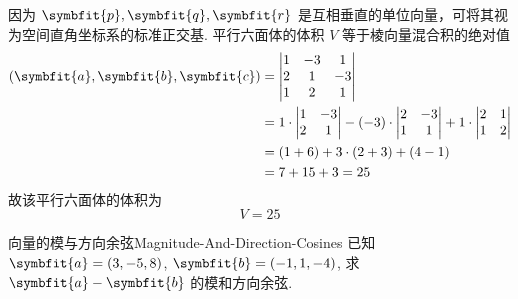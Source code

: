 \begin{solution}
    因为 $\symbfit{p}, \symbfit{q}, \symbfit{r}$ 是互相垂直的单位向量，可将其视为空间直角坐标系的标准正交基. 平行六面体的体积 $V$ 等于棱向量混合积的绝对值
    \begin{equation}
        \begin{aligned}
            (\symbfit{a}, \symbfit{b}, \symbfit{c}) & = \begin{vmatrix} 1 & -3 & 1 \\ 2 & 1 & -3 \\ 1 & 2 & 1 \end{vmatrix}                                                                                                     \\
                                                    & = 1 \cdot \begin{vmatrix} 1 & -3 \\ 2 & 1 \end{vmatrix} - (-3) \cdot \begin{vmatrix} 2 & -3 \\ 1 & 1 \end{vmatrix} + 1 \cdot \begin{vmatrix} 2 & 1 \\ 1 & 2 \end{vmatrix} \\
                                                    & = (1 + 6) + 3 \cdot (2 + 3) + (4 - 1)                                                                                                                                     \\
                                                    & = 7 + 15 + 3 = 25
        \end{aligned}
    \end{equation}
    故该平行六面体的体积为
    \begin{equation}
        \boxed{V = 25}
    \end{equation}
\end{solution}


\begin{problem}{向量的模与方向余弦}{Magnitude-And-Direction-Cosines}
    已知 $\symbfit{a} = (3, -5, 8)$, $\symbfit{b} = (-1, 1, -4)$, 求 $\symbfit{a} - \symbfit{b}$ 的模和方向余弦.
\end{problem}

